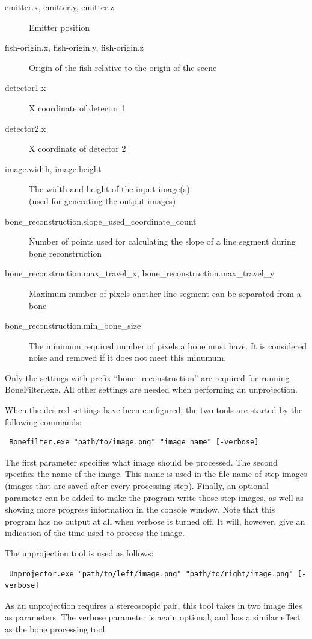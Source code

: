 \begin{description}
	\item[emitter.x, emitter.y, emitter.z]
		Emitter position 
	\item [fish-origin.x, fish-origin.y, fish-origin.z]
		Origin of the fish relative to the origin of the scene 
	\item [detector1.x] 
		X coordinate of detector 1
	\item [detector2.x] 
		X coordinate of detector 2
	\item [image.width, image.height] 
		The width and height of the input image(s) \\ (used for generating the output images)

	\item [bone\_reconstruction.slope\_used\_coordinate\_count]
		Number of points used for calculating the slope of a line segment during bone reconstruction
	\item [bone\_reconstruction.max\_travel\_x, bone\_reconstruction.max\_travel\_y]
		Maximum number of pixels another line segment can be separated from a bone
	\item [bone\_reconstruction.min\_bone\_size]
		The minimum required number of pixels a bone must have. It is considered noise and removed if it does not meet this minumum. 
\end{description}

Only the settings with prefix ``bone\_reconstruction'' are required for running BoneFilter.exe. All other settings are needed when performing an unprojection.

When the desired settings have been configured, the two tools are started by the following commands:

\begin{verbatim} Bonefilter.exe "path/to/image.png" "image_name" [-verbose] \end{verbatim}

The first parameter specifies what image should be processed. The second specifies the name of the image. This name is used in the file name of step images (images that are saved after every processing step). Finally, an optional parameter can be added to make the program write those step images, as well as showing more progress information in the console window. Note that this program has no output at all when verbose is turned off. It will, however, give an indication of the time used to process the image. 

The unprojection tool is used as follows:

\begin{verbatim} Unprojector.exe "path/to/left/image.png" "path/to/right/image.png" [-verbose] \end{verbatim}

As an unprojection requires a stereoscopic pair, this tool takes in two image files as parameters. The verbose parameter is again optional, and has a similar effect as the bone processing tool.